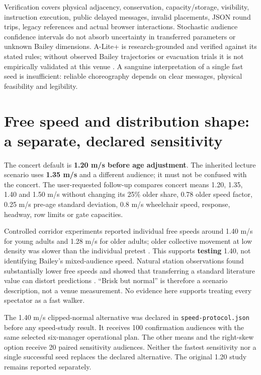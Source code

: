 \documentclass[11pt,a4paper]{article}
\newcommand{\code}[1]{{\small\nolinkurl{#1}}}
\begin{document}
Verification covers physical adjacency, conservation, capacity/storage, visibility, instruction execution, public delayed messages, invalid placements, JSON round trips, legacy references and actual browser interactions. Stochastic audience confidence intervals do not absorb uncertainty in transferred parameters or unknown Bailey dimensions. A-Lite+ is research-grounded and verified against its stated rules; without observed Bailey trajectories or evacuation trials it is not empirically validated at this venue \cite{R21,R22}. A sanguine interpretation of a single fast seed is insufficient: reliable choreography depends on clear messages, physical feasibility and legibility.


\section{Free speed and distribution shape: a separate, declared sensitivity}\label{sec:25}

The concert default is \textbf{1.20 m/s before age adjustment}. The inherited lecture scenario uses \textbf{1.35 m/s} and a different audience; it must not be confused with the concert. The user-requested follow-up compares concert means 1.20, 1.35, 1.40 and 1.50 m/s without changing its 25\% older share, 0.78 older speed factor, 0.25 m/s pre-age standard deviation, 0.8 m/s wheelchair speed, response, headway, row limits or gate capacities.


Controlled corridor experiments reported individual free speeds around 1.40 m/s for young adults and 1.28 m/s for older adults; older collective movement at low density was slower than the individual pretest \cite{R26}. This supports \textbf{testing} 1.40, not identifying Bailey's mixed-audience speed. Natural station observations found substantially lower free speeds and showed that transferring a standard literature value can distort predictions \cite{R27}. “Brisk but normal” is therefore a scenario description, not a venue measurement. No evidence here supports treating every spectator as a fast walker.


The 1.40 m/s clipped-normal alternative was declared in \code{speed-protocol.json} before any speed-study result. It receives 100 confirmation audiences with the same selected six-manager operational plan. The other means and the right-skew option receive 20 paired sensitivity audiences. Neither the fastest sensitivity nor a single successful seed replaces the declared alternative. The original 1.20 study remains reported separately.
\end{document}
